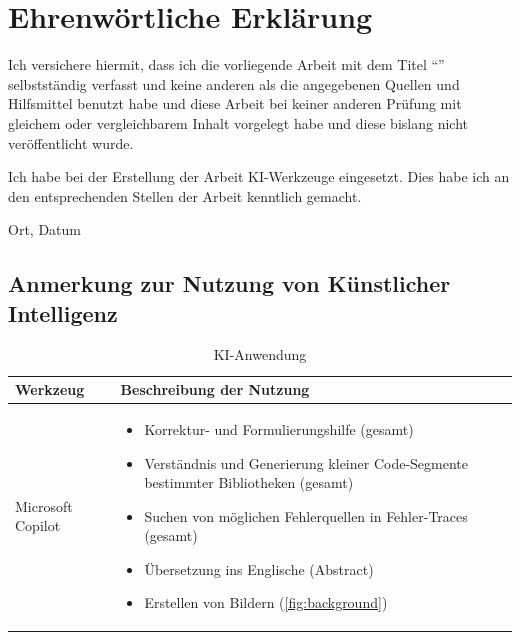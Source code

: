 \clearpage
\chapter*{Ehrenwörtliche Erklärung}


Ich versichere hiermit, dass ich die vorliegende Arbeit mit dem Titel ``\textit{\DerTitelDerArbeit}'' selbstständig verfasst und 
keine anderen als die angegebenen Quellen und Hilfsmittel benutzt habe und diese Arbeit bei keiner anderen Prüfung mit 
gleichem oder vergleichbarem Inhalt vorgelegt habe und diese bislang nicht veröffentlicht wurde.

Ich habe bei der Erstellung der Arbeit KI-Werkzeuge eingesetzt. Dies habe ich an den entsprechenden 
Stellen der Arbeit kenntlich gemacht.

\vspace{3cm}

Ort, Datum \hfill \DerAutorDerArbeit

\vfill

\section*{Anmerkung zur Nutzung von Künstlicher Intelligenz}
\begin{table}[htbp] 
    \centering  
    \begin{tabular}{|m{4cm}|m{10cm}|} 
        \hline 
        Werkzeug & Beschreibung der Nutzung \\ 
        \hline 
        Microsoft Copilot & 
        \begin{itemize}
            \item Korrektur- und Formulierungshilfe (gesamt)
            \item Verständnis und Generierung kleiner Code-Segmente bestimmter Bibliotheken (gesamt)
            \item Suchen von möglichen Fehlerquellen in Fehler-Traces (gesamt)
            \item Übersetzung ins Englische (Abstract)
            \item Erstellen von Bildern (\cref{fig:background})
        \end{itemize} \\
        \hline
    \end{tabular} 
    \caption{KI-Anwendung}
    \label{tab:ki}
\end{table}
